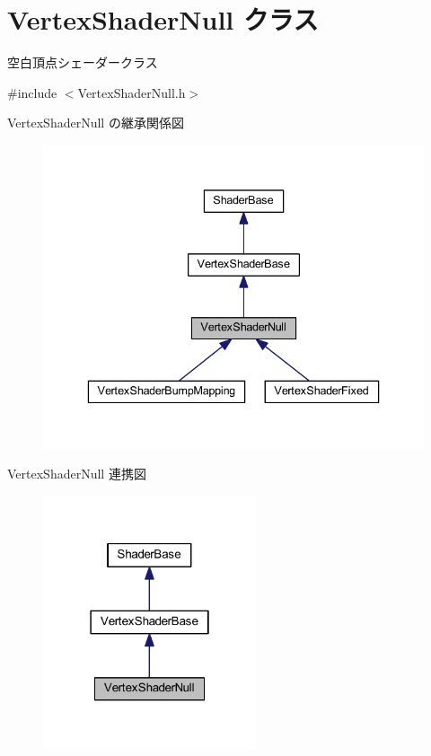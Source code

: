 \hypertarget{class_vertex_shader_null}{}\section{Vertex\+Shader\+Null クラス}
\label{class_vertex_shader_null}


空白頂点シェーダークラス  




{\ttfamily \#include $<$Vertex\+Shader\+Null.\+h$>$}



Vertex\+Shader\+Null の継承関係図\nopagebreak
\begin{figure}[H]
\begin{center}
\leavevmode
\includegraphics[width=336pt]{class_vertex_shader_null__inherit__graph}
\end{center}
\end{figure}


Vertex\+Shader\+Null 連携図\nopagebreak
\begin{figure}[H]
\begin{center}
\leavevmode
\includegraphics[width=178pt]{class_vertex_shader_null__coll__graph}
\end{center}
\end{figure}
